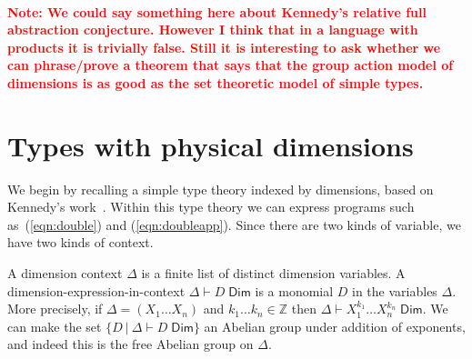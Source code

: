 \documentclass[a4paper,UKenglish]{lipics}
\newcommand\note[1]{{ \bf \textcolor{red} {\vspace{2mm}\; \\ Note: #1\\}}}
\newcommand{\msf}[1]{\mathsf{#1}} %
\newcommand{\Ab}{\msf{Ab}}
\newcommand{\LAb}{\msf{L}_{\msf{Ab}}}
\newcommand{\C}{\mathcal{C}}
\newcommand{\Dj}[2]{#1 \vdash #2 \; \msf{ Dim}}
\newcommand{\Dim}{D}
\newcommand{\Dvar}{X}
\begin{document}
\note{We could say something here about Kennedy's relative full abstraction conjecture.
However I think that in a language with products it is trivially false. Still it is interesting
to ask whether we can phrase/prove a theorem that says that the group action model of
dimensions is as good
as the set theoretic model of simple types.}

\section{Types with physical dimensions}
\label{sec:Not}
We begin by recalling a simple type theory indexed by dimensions, based
on Kennedy's work~\cite{}.
Within this type theory we can express programs such as~(\ref{eqn:double}) and
(\ref{eqn:doubleapp}).
Since there are two kinds of variable, we have two kinds of context.

A dimension context $\Delta$ is a finite list of distinct
dimension variables.
A dimension-expression-in-context $\Dj\Delta \Dim$ is a monomial
$\Dim$ in the variables $\Delta$.
More precisely,
if $\Delta=(\Dvar_1\dots \Dvar_n)$ and $k_1\dots k_n\in\mathbb Z$
then $\Dj \Delta{\Dvar_1^{k_1}\dots \Dvar_n^{k_n}}$.
We can make the set $\{\Dim~|~\Dj \Delta \Dim\}$ an Abelian group under addition of
exponents, and indeed this is the free Abelian group on $\Delta$.

\end{document}
